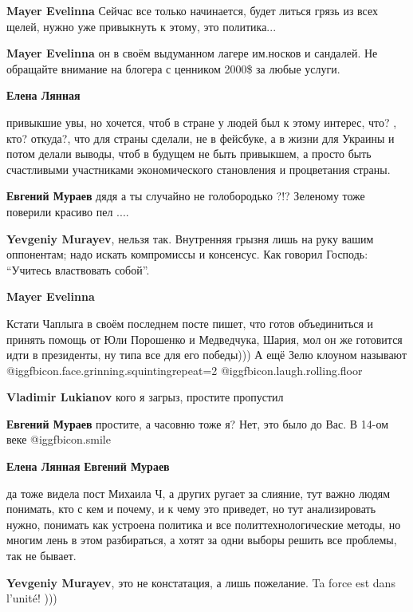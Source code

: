 \begin{itemize}
\begin{itemize}
\textbf{Mayer Evelinna} Сейчас все только начинается, будет литься грязь из всех щелей, нужно уже привыкнуть к этому, это политика...

\textbf{Mayer Evelinna} он в своём выдуманном лагере им.носков и сандалей. 
Не обращайте внимание на блогера с ценником 2000\$ за любые услуги.


\textbf{Елена Лянная} 

привыкшие увы, но хочется, чтоб в стране у людей был к этому интерес, что? ,
кто? откуда?, что для страны сделали, не в фейсбуке, а в жизни для Украины и
потом делали выводы, чтоб в будущем не быть привыкшем, а просто быть
счастливыми участниками экономического становления и процветания страны.

\textbf{Евгений Мураев} дядя а ты случайно не голобородько ?!? Зеленому тоже поверили красиво пел ....

\textbf{Yevgeniy Murayev}, нельзя так. 
Внутренняя грызня лишь на руку вашим оппонентам; надо искать компромиссы и
консенсус. Как говорил Господь: \enquote{Учитесь властвовать собой}.


\textbf{Mayer Evelinna} 

Кстати Чаплыга в своём последнем посте пишет, что готов объединиться и принять
помощь от Юли Порошенко и Медведчука, Шария, мол он же готовится идти в
президенты, ну типа все для его победы))) А ещё Зелю клоуном называют  
@igg{fbicon.face.grinning.squinting}{repeat=2}  @igg{fbicon.laugh.rolling.floor} 

\textbf{Vladimir Lukianov} кого я загрыз, простите пропустил

\textbf{Евгений Мураев} простите, а часовню тоже я? Нет, это было до Вас. В 14-ом веке  @igg{fbicon.smile} 

\textbf{Елена Лянная} \textbf{Евгений Мураев} 

да тоже видела пост Михаила Ч, а других ругает за слияние, тут важно людям
понимать, кто с кем и почему, и к чему это приведет, но тут анализировать
нужно, понимать как устроена политика и все политтехнологические методы, но
многим лень в этом разбираться, а хотят за одни выборы решить все проблемы, так
не бывает.

\textbf{Yevgeniy Murayev}, это не констатация, а лишь пожелание. Ta force est dans l'unité! )))

\end{itemize} %


\end{itemize}
